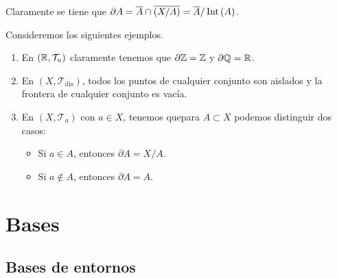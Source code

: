 \begin{observation}
Claramente se tiene que $\displaystyle \partial A = \overline{A} \cap \overline{\left(X / A\right)}= \overline{A}/\operatorname{Int}\left(A\right) $. 
\end{observation}
\begin{eg}
Consideremos los siguientes ejemplos.
\begin{enumerate}
\item En $\displaystyle \left(\mathbb{R}, \mathcal{T}_{u}\right) $ claramente tenemos que $\displaystyle \partial \mathbb{Z} = \mathbb{Z} $ y $\displaystyle \partial \mathbb{Q} = \mathbb{R} $. 
\item En $\displaystyle \left(X, \mathcal{T}_{\text{dis}}\right) $, todos los puntos de cualquier conjunto son aislados y la frontera de cualquier conjunto es vacía. 
\item En $\displaystyle \left(X, \mathcal{T}_{a}\right) $ con $\displaystyle a \in X $, tenemos quepara $\displaystyle A \subset X $ podemos distinguir dos casos:
\begin{itemize}
	\item Si $\displaystyle a \in A $, entonces $\displaystyle \partial A = X/A$. 
	\item Si $\displaystyle a \not\in A $, entonces $\displaystyle \partial A = A $. 
\end{itemize}
\end{enumerate}
\end{eg}

\section{Bases}
\subsection{Bases de entornos}

